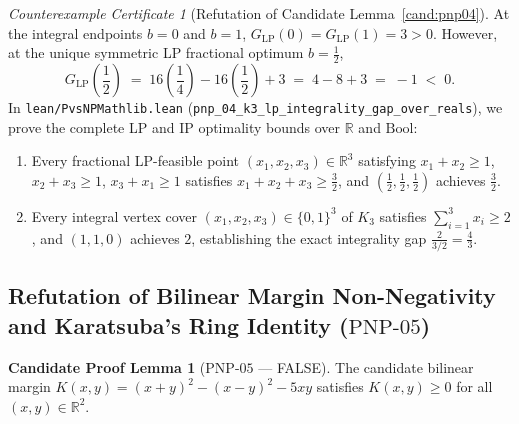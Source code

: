 \documentclass[11pt,a4paper]{article}
\theoremstyle{plain}
\theoremstyle{definition}
\newtheorem{candidate}[theorem]{Candidate Proof Lemma}
\theoremstyle{remark}
\newtheorem{counterexample}[theorem]{Counterexample Certificate}
\newcommand{\R}{\mathbb{R}}
\begin{document}
\begin{counterexample}[Refutation of Candidate Lemma~\ref{cand:pnp04}]
At the integral endpoints $b = 0$ and $b = 1$, $G_{\mathrm{LP}}(0) = G_{\mathrm{LP}}(1) = 3 > 0$. However, at the unique symmetric LP fractional optimum $b = \frac{1}{2}$,
\begin{equation}
  G_{\mathrm{LP}}\!\left(\frac{1}{2}\right) \;=\; 16\left(\frac{1}{4}\right) - 16\left(\frac{1}{2}\right) + 3 \;=\; 4 - 8 + 3 \;=\; -1 \;<\; 0.
\end{equation}
In \texttt{lean/PvsNPMathlib.lean} (\texttt{pnp\_04\_k3\_lp\_integrality\_gap\_over\_reals}), we prove the complete LP and IP optimality bounds over $\R$ and $\mathrm{Bool}$:
\begin{enumerate}
  \item Every fractional LP-feasible point $(x_1, x_2, x_3) \in \R^3$ satisfying $x_1+x_2 \ge 1$, $x_2+x_3 \ge 1$, $x_3+x_1 \ge 1$ satisfies $x_1 + x_2 + x_3 \ge \frac{3}{2}$, and $(\frac{1}{2}, \frac{1}{2}, \frac{1}{2})$ achieves $\frac{3}{2}$.
  \item Every integral vertex cover $(x_1, x_2, x_3) \in \{0, 1\}^3$ of $K_3$ satisfies $\sum_{i=1}^{3} x_i \ge 2$, and $(1, 1, 0)$ achieves $2$, establishing the exact integrality gap $\frac{2}{3/2} = \frac{4}{3}$.
\end{enumerate}
\end{counterexample}

\subsection{Refutation of Bilinear Margin Non-Negativity and Karatsuba's Ring Identity (\texorpdfstring{$\mathrm{PNP\text{-}05}$}{PNP-05})}

\begin{candidate}[$\mathrm{PNP\text{-}05}$ --- FALSE]\label{cand:pnp05}
The candidate bilinear margin $K(x, y) = (x + y)^2 - (x - y)^2 - 5xy$ satisfies $K(x, y) \ge 0$ for all $(x, y) \in \R^2$.
\end{candidate}
\end{document}
